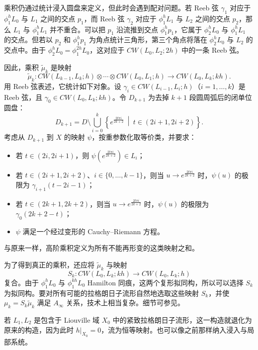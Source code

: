 乘积仍通过统计浸入圆盘来定义，但此时会遇到配对问题。若 Reeb 弦 $\gamma_1$ 对应于 $\phi_1^hL_0$ 与 $L_1$ 之间的交点 $p_1$，而 Reeb 弦 $\gamma_2$ 对应于 $\phi_1^hL_1$ 与 $L_2$ 之间的交点 $p_2$，那么 $L_1$ 与 $\phi_1^hL_1$ 并不重合。可以把 $p_1$ 沿流推到交点 $\phi_1^hp_1$，它属于 $\phi_2^hL_0$ 与 $\phi_1^hL_1$ 的交点。但若以 $p_2$ 和 $\phi_1^hp_1$ 为角点统计三角形，第三个角点将落在 $\phi_2^hL_0$ 与 $L_2$ 的交点中。由于 $\phi_2^hL_0=\phi_1^{2h}L_0$，这对应于 $CW(L_0,L_2;2h)$ 中的一条 Reeb 弦。

因此，乘积 $\widetilde\mu_k$ 是映射
\[
  \widetilde\mu_k\colon
  CW(L_{k-1},L_k;h)\otimes\cdots\otimes CW(L_0,L_1;h)
  \longrightarrow CW(L_0,L_k;kh).
\]
用 Reeb 弦表述，它统计如下对象。设 $\gamma_i\in CW(L_{i-1},L_i;h)$（$i=1,\ldots,k$）是 Reeb 弦，且 $\gamma_0\in CW(L_0,L_k;kh)$。令 $D_{k+1}$ 为去掉 $k+1$ 段圆周弧后的闭单位圆盘：
\[
  D_{k+1}=D\setminus
  \bigcup_{i=0}^{k}\left\{
  e^{\frac{2t\pi i}{2k+2}}\ \middle|\ t\in(2i+1,2i+2)\right\}.
\]
考虑从 $D_{k+1}$ 到 $X$ 的映射 $\psi$，按重参数化取等价类，并要求：
\begin{itemize}
  \item 若 $t\in(2i,2i+1)$，则 $\psi(e^{\frac{2t\pi i}{2k+2}})\in L_i$；
  \item 若 $t\in(2i+1,2i+2)$、$i\in\{0,\ldots,k-1\}$，则当 $u\to e^{\frac{2t\pi i}{2k+2}}$ 时，$\psi(u)$ 的极限为 $\gamma_{i+1}(t-2i-1)$；
  \item 若 $t\in(2k+1,2k+2)$，则当 $u\to e^{\frac{2t\pi i}{2k+2}}$ 时，$\psi(u)$ 的极限为 $\gamma_0(2k+2-t)$；
  \item $\psi$ 满足一个经过变形的 Cauchy--Riemann 方程。
\end{itemize}
与原来一样，高阶乘积定义为所有不能再形变的这类映射之和。

为了得到真正的乘积，还应将 $\widetilde\mu_k$ 与映射
\[
  S_k\colon CW(L_0,L_k;kh)\to CW(L_0,L_k;h)
\]
复合。由于 $\phi_1^hL_0$ 与 $\phi_1^{kh}L_0$ Hamilton 同痕，这两个复形拟同构，所以可以选择 $S_k$ 为拟同构。要对所有可能的拉格朗日子流形自然地选取这些映射 $S_k$，并使 $\mu_k=S_k\widetilde\mu_k$ 满足 $A_\infty$ 关系，技术上相当复杂。细节可参见。

若 $L_1,L_2$ 是包含于 Liouville 域 $X_0$ 中的紧致拉格朗日子流形，这一构造就退化为原来的构造，因为此时 $h|_{X_0}=0$，流为恒等映射。也可以像之前那样纳入浸入与局部系统。

